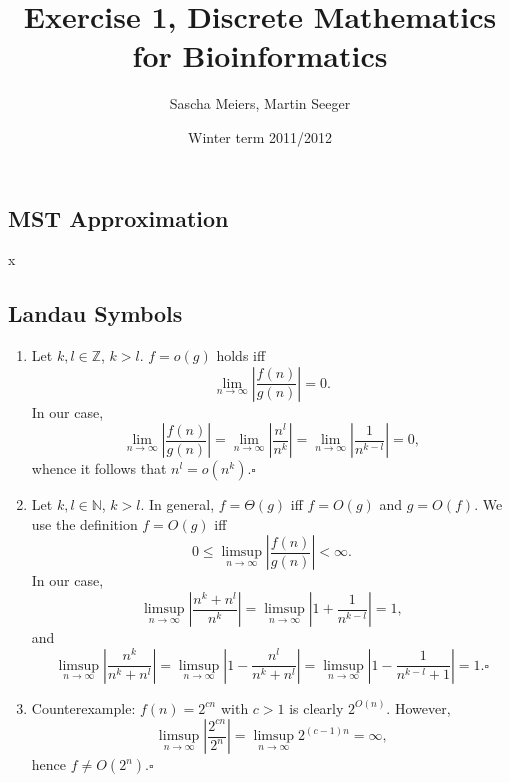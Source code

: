 \documentclass[a4paper]{article}
\author{Sascha Meiers, Martin Seeger}
\title{Exercise 1, Discrete Mathematics for Bioinformatics}
\date{Winter term 2011/2012}
\begin{document}
\maketitle


\subsection{MST Approximation}

x

\subsection{Landau Symbols}

\renewcommand{\labelenumi}{\alph{enumi})}
\begin{enumerate}
\item Let $k, l \in \mathbb{Z}$, $k > l$. $f = o(g)$ holds iff 
\begin{equation}
\lim_{n\rightarrow \infty} \left|\frac{f(n)}{g(n)}\right| = 0. 
\end{equation}
In our case, 
\begin{equation}
\lim_{n\rightarrow \infty} \left|\frac{f(n)}{g(n)}\right| = \lim_{n\rightarrow
\infty} \left|\frac{n^l}{n^k}\right| = \lim_{n\rightarrow
\infty} \left|\frac{1}{n^{k-l}}\right| = 0,
\end{equation}
whence it follows that $n^l=o(n^k)$.$\square$

\item Let $k, l \in \mathbb{N}$, $k > l$. In general, $f=\Theta(g)$ iff
$f=O(g)$ and $g=O(f)$. We use the definition $f=O(g)$ iff
\begin{equation}
0 \leq \limsup_{n\rightarrow \infty} \left|\frac{f(n)}{g(n)}\right| < \infty. 
\end{equation}
In our case, 
\begin{equation}
\limsup_{n\rightarrow \infty} \left|\frac{n^k+n^l}{n^k}\right| =
\limsup_{n\rightarrow \infty} \left|1 + \frac{1}{n^{k-l}}\right| = 1,
\end{equation}
and
\begin{equation}
\limsup_{n\rightarrow \infty} \left|\frac{n^k}{n^k+n^l}\right| =
\limsup_{n\rightarrow \infty} \left|1 - \frac{n^l}{n^k+n^l}\right| =
\limsup_{n\rightarrow \infty} \left|1 - \frac{1}{n^{k-l}+1}\right| =
1.\square
\end{equation}
 
\item Counterexample: $f(n)=2^{cn}$ with $c>1$ is clearly $2^{O(n)}$. However, 
\begin{equation}
\limsup_{n\rightarrow \infty} \left|\frac{2^{cn}}{2^{n}}\right| =
\limsup_{n\rightarrow \infty} 2^{(c-1)n} = \infty,
\end{equation}
hence $f \neq O(2^n)$.$\square$
\end{enumerate}
\end{document}
